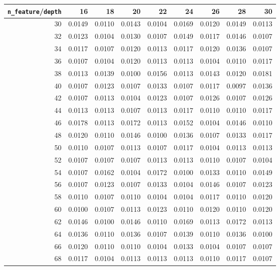 \documentclass[11pt]{article}
\theoremstyle{definition}
\begin{document}
\newpage
\begin{table}[ht]
\centering
\begin{tabular}{rrrrrrrrr}
 \hline
{\tt n\_feature}/{\tt depth} & 16 & 18 & 20 & 22 & 24 & 26 & 28 & 30 \\ 
  \hline
30 & 0.0149 & 0.0110 & 0.0143 & 0.0104 & 0.0169 & 0.0120 & 0.0149 & 0.0113 \\ 
  32 & 0.0123 & 0.0104 & 0.0130 & 0.0107 & 0.0149 & 0.0117 & 0.0146 & 0.0107 \\ 
  34 & 0.0117 & 0.0107 & 0.0120 & 0.0113 & 0.0117 & 0.0120 & 0.0136 & 0.0107 \\ 
  36 & 0.0107 & 0.0104 & 0.0120 & 0.0113 & 0.0113 & 0.0104 & 0.0110 & 0.0117 \\ 
  38 & 0.0113 & 0.0139 & 0.0100 & 0.0156 & 0.0113 & 0.0143 & 0.0120 & 0.0181 \\ 
  40 & 0.0107 & 0.0123 & 0.0107 & 0.0133 & 0.0107 & 0.0117 & 0.0097 & 0.0136 \\ 
  42 & 0.0107 & 0.0113 & 0.0104 & 0.0123 & 0.0107 & 0.0126 & 0.0107 & 0.0126 \\ 
  44 & 0.0113 & 0.0113 & 0.0107 & 0.0113 & 0.0117 & 0.0110 & 0.0110 & 0.0117 \\ 
  46 & 0.0178 & 0.0113 & 0.0172 & 0.0113 & 0.0152 & 0.0104 & 0.0146 & 0.0110 \\ 
  48 & 0.0120 & 0.0110 & 0.0146 & 0.0100 & 0.0136 & 0.0107 & 0.0133 & 0.0117 \\ 
  50 & 0.0110 & 0.0107 & 0.0113 & 0.0107 & 0.0117 & 0.0104 & 0.0113 & 0.0113 \\ 
  52 & 0.0107 & 0.0107 & 0.0107 & 0.0113 & 0.0113 & 0.0110 & 0.0107 & 0.0104 \\ 
  54 & 0.0107 & 0.0162 & 0.0104 & 0.0172 & 0.0100 & 0.0133 & 0.0110 & 0.0149 \\ 
  56 & 0.0107 & 0.0123 & 0.0107 & 0.0133 & 0.0104 & 0.0146 & 0.0107 & 0.0123 \\ 
  58 & 0.0110 & 0.0107 & 0.0110 & 0.0104 & 0.0104 & 0.0117 & 0.0110 & 0.0120 \\ 
  60 & 0.0100 & 0.0107 & 0.0113 & 0.0123 & 0.0110 & 0.0120 & 0.0110 & 0.0120 \\ 
  62 & 0.0146 & 0.0100 & 0.0146 & 0.0110 & 0.0169 & 0.0113 & 0.0172 & 0.0113 \\ 
  64 & 0.0136 & 0.0110 & 0.0136 & 0.0107 & 0.0139 & 0.0110 & 0.0136 & 0.0100 \\ 
  66 & 0.0120 & 0.0110 & 0.0110 & 0.0104 & 0.0133 & 0.0104 & 0.0107 & 0.0107 \\ 
  68 & 0.0117 & 0.0104 & 0.0113 & 0.0113 & 0.0113 & 0.0110 & 0.0117 & 0.0107 \\ 

\end{tabular}
\end{table}
\end{document}
